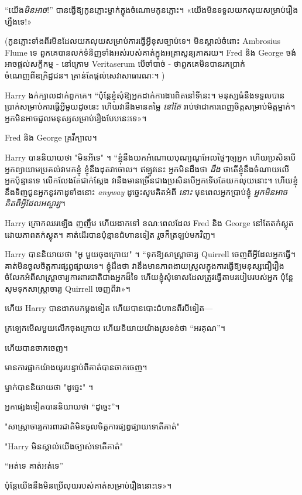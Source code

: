{{“យើង\emph{មិនអាច}!” បានធ្វើឱ្យកូនភ្លោះម្នាក់ក្នុងចំណោមកូនភ្លោះ។ «យើង​មិន​ទទួល​យក​លុយ​សម្រាប់​រឿង​ហ្នឹង​ទេ!»

(កូនភ្លោះទាំងពីរមិនដែលយកលុយសម្រាប់ការធ្វើអ្វីខុសច្បាប់ទេ។ មិនស្គាល់ចំពោះ Ambrosius Flume ទេ ពួកគេបានលក់ទំនិញទាំងអស់របស់គាត់ក្នុងអត្រាសូន្យភាគរយ។ Fred និង George ចង់អាចផ្តល់សក្ខីកម្ម - នៅក្រោម Veritaserum បើចាំបាច់ - ថាពួកគេមិនបានរកប្រាក់ចំណេញពីឧក្រិដ្ឋជន។ គ្រាន់តែផ្តល់សេវាសាធារណៈ។ )

Harry ងក់ក្បាលដាក់ពួកគេ។ “ប៉ុន្តែខ្ញុំសុំឱ្យអ្នកដាក់ការងារពិតនៅទីនេះ។ មនុស្សធំនឹងទទួលបានប្រាក់សម្រាប់ការធ្វើអ្វីមួយដូចនេះ ហើយវានឹងមានតម្លៃ \emph{នៅតែ} រាប់ថាជាការពេញចិត្តសម្រាប់មិត្តម្នាក់។ អ្នក​មិន​អាច​ជួល​មនុស្ស​សម្រាប់​រឿង​បែប​នេះ​ទេ»។

Fred និង George គ្រវីក្បាល។

Harry បាននិយាយថា "មិនអីទេ" ។ “ខ្ញុំ​នឹង​យក​អំណោយ​បុណ្យ​ណូអែល​ថ្លៃ​ៗ​ឲ្យ​អ្នក ហើយ​ប្រសិន​បើ​អ្នក​ព្យាយាម​ប្រគល់​វា​មក​ខ្ញុំ ខ្ញុំ​នឹង​ដុត​វា​ចោល។ ឥឡូវនេះ អ្នកមិនដឹងថា \emph{ដឹង} ថាតើខ្ញុំនឹងចំណាយលើអ្នកប៉ុន្មានទេ លើកលែងតែជាក់ស្តែង វានឹងមានច្រើនជាងប្រសិនបើអ្នកទើបតែយកលុយនោះ។ ហើយខ្ញុំនឹងទិញជូនអ្នកនូវកាដូទាំងនោះ \emph{anyway} ដូច្នេះសូមគិតអំពី \emph{នោះ} មុនពេលអ្នកប្រាប់ខ្ញុំ \emph{អ្នកមិនអាចគិតពីអ្វីដែលអស្ចារ្យ}។

Harry ក្រោកឈរឡើង ញញឹម ហើយងាកទៅ ខណៈពេលដែល Fred និង George នៅតែតក់ស្លុតដោយភាពតក់ស្លុត។ គាត់​ដើរ​បាន​ប៉ុន្មាន​ជំហាន​ទៀត រួច​ក៏​ត្រឡប់​មក​វិញ។

Harry បាននិយាយថា "អូ មួយចុងក្រោយ" ។ “ទុកឱ្យសាស្រ្តាចារ្យ Quirrell ចេញពីអ្វីដែលអ្នកធ្វើ។ គាត់មិនចូលចិត្តការផ្សព្វផ្សាយទេ។ ខ្ញុំដឹងថា វានឹងមានភាពងាយស្រួលក្នុងការធ្វើឱ្យមនុស្សជឿរឿងចំលែកអំពីសាស្ត្រាចារ្យការពារជាតិជាងអ្នកដ៏ទៃ ហើយខ្ញុំសុំទោសដែលត្រូវធ្វើតាមរបៀបរបស់អ្នក ប៉ុន្តែសូមទុកសាស្ត្រាចារ្យ Quirrell ចេញពីវា»។

ហើយ Harry បានងាកមកម្តងទៀត ហើយបានបោះជំហានពីរបីទៀត—

ក្រឡេកមើលមួយលើកចុងក្រោយ ហើយនិយាយយ៉ាងស្រទន់ថា “អរគុណ”។

ហើយបានចាកចេញ។

មាន​ការ​ផ្អាក​យ៉ាង​យូរ​បន្ទាប់​ពី​គាត់​បាន​ចាកចេញ។

ម្នាក់បាននិយាយថា "ដូច្នេះ" ។

អ្នក​ផ្សេង​ទៀត​បាន​និយាយ​ថា “ដូច្នេះ”។

"សាស្ត្រាចារ្យការពារជាតិមិនចូលចិត្តការផ្សព្វផ្សាយទេតើគាត់"

"Harry មិនស្គាល់យើងច្បាស់ទេតើគាត់"

“អត់ទេ គាត់អត់ទេ”

ប៉ុន្តែ​យើង​នឹង​មិន​ប្រើ​លុយ​របស់​គាត់​សម្រាប់​រឿង​នោះ​ទេ​»។

}}
